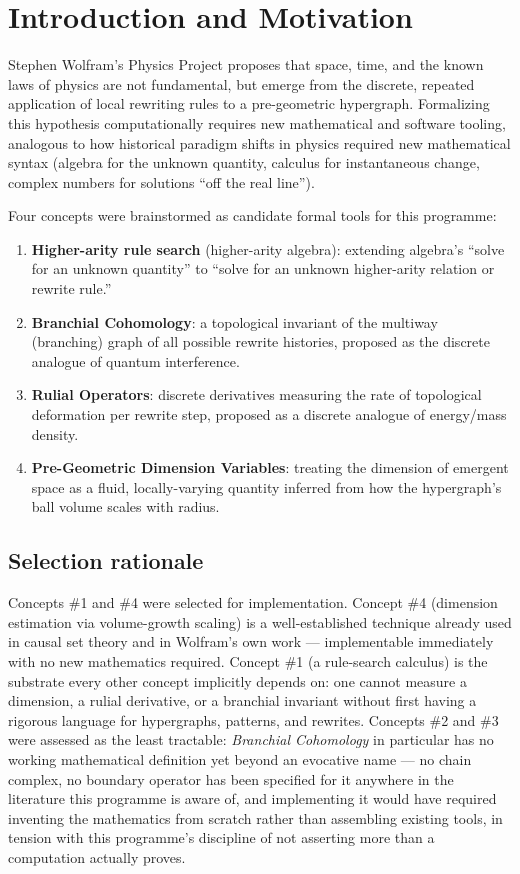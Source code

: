 \documentclass[11pt,a4paper]{article}
\begin{document}
\tableofcontents

\section{Introduction and Motivation}

Stephen Wolfram's Physics Project proposes that space, time, and the known
laws of physics are not fundamental, but emerge from the discrete,
repeated application of local rewriting rules to a pre-geometric
hypergraph. Formalizing this hypothesis computationally requires new
mathematical and software tooling, analogous to how historical paradigm
shifts in physics required new mathematical syntax (algebra for the
unknown quantity, calculus for instantaneous change, complex numbers for
solutions ``off the real line'').

Four concepts were brainstormed as candidate formal tools for this
programme:

\begin{enumerate}
\item \textbf{Higher-arity rule search} (higher-arity algebra): extending
  algebra's ``solve for an unknown quantity'' to ``solve for an unknown
  higher-arity relation or rewrite rule.''
\item \textbf{Branchial Cohomology}: a topological invariant of the
  multiway (branching) graph of all possible rewrite histories, proposed
  as the discrete analogue of quantum interference.
\item \textbf{Rulial Operators}: discrete derivatives measuring the rate
  of topological deformation per rewrite step, proposed as a discrete
  analogue of energy/mass density.
\item \textbf{Pre-Geometric Dimension Variables}: treating the dimension
  of emergent space as a fluid, locally-varying quantity inferred from how
  the hypergraph's ball volume scales with radius.
\end{enumerate}

\subsection{Selection rationale}

Concepts \#1 and \#4 were selected for implementation. Concept \#4
(dimension estimation via volume-growth scaling) is a well-established
technique already used in causal set theory and in Wolfram's own work ---
implementable immediately with no new mathematics required. Concept \#1
(a rule-search calculus) is the substrate every other concept implicitly
depends on: one cannot measure a dimension, a rulial derivative, or a
branchial invariant without first having a rigorous language for
hypergraphs, patterns, and rewrites. Concepts \#2 and \#3 were assessed as
the least tractable: \emph{Branchial Cohomology} in particular has no
working mathematical definition yet beyond an evocative name --- no chain
complex, no boundary operator has been specified for it anywhere in the
literature this programme is aware of, and implementing it would have
required inventing the mathematics from scratch rather than assembling
existing tools, in tension with this programme's discipline of not
asserting more than a computation actually proves.
\end{document}
